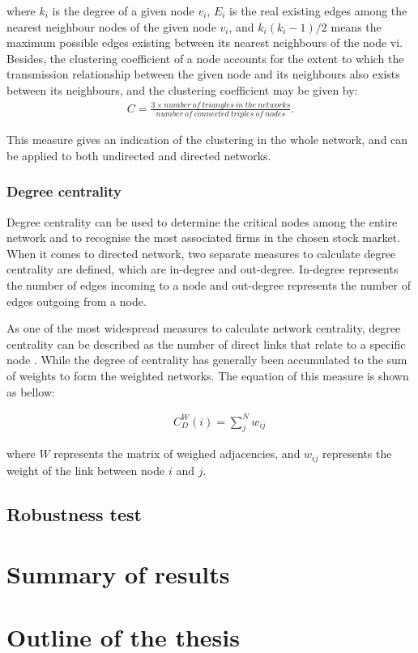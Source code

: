where $k_i$ is the degree of a given node $v_i$, $E_i$ is the real existing edges among the nearest neighbour nodes of the given node $v_i$, and $k_i(k_i-1)/2$ means the maximum possible edges existing between its nearest neighbours of the node vi. Besides, the clustering coefficient of a node accounts for the extent to which the transmission relationship between the given node and its neighbours also exists between its neighbours, and the clustering coefficient may be given by:
\begin{eqnarray}
C=\frac{3\times number\ of\ triangles\ in\ the\ networks}{number\ of\ connected\ triples\ of\ nodes}.
\end{eqnarray}

This measure gives an indication of the clustering in the whole network, and can be applied to both undirected and directed networks.

\subsubsection{Degree centrality}
Degree centrality can be used to determine the critical nodes among the entire network and to recognise the most associated firms in the chosen stock market. When it comes to directed network, two separate measures to calculate degree centrality are defined, which are in-degree and out-degree. In-degree represents the number of edges incoming to a node and out-degree represents the number of edges outgoing from a node.

As one of the most widespread measures to calculate network centrality, degree centrality can be described as the number of direct links that relate to a specific node \cite{freeman}. While the degree of centrality has generally been accumulated to the sum of weights to form the weighted networks. The equation of this measure is shown as bellow:

\begin{eqnarray}
&&C_D^W(i)=\sum_{j}^{N}w_{ij}
\end{eqnarray}

where $W$ represents the matrix of weighed adjacencies, and $w_{ij}$ represents the weight of the link between node $i$ and $j$.


\subsection{Robustness test}

\section{Summary of results}

\section{Outline of the thesis}

